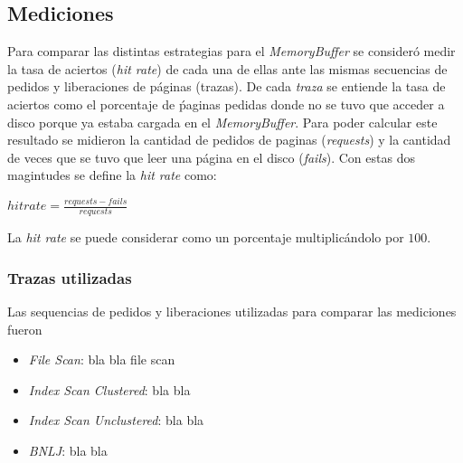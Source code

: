 \subsection{Mediciones}
Para comparar las distintas estrategias para el \textit{MemoryBuffer} se consider\'o medir
la tasa de aciertos (\textit{hit rate}) de cada una de ellas ante las mismas secuencias 
de pedidos y liberaciones de p\'aginas (trazas). De cada \textit{traza} se entiende la tasa
de aciertos como el porcentaje de \'paginas pedidas donde no se tuvo que acceder a disco
porque ya estaba cargada en el \textit{MemoryBuffer}. Para poder calcular este resultado
se midieron la cantidad de pedidos de paginas (\textit{requests}) y la cantidad de veces
que se tuvo que leer una p\'agina en el disco (\textit{fails}). Con estas dos magintudes
se define la \textit{hit rate} como: \\
\begin{center}
$hit rate = \frac{requests-fails}{requests}$  
\end{center}
La \textit{hit rate} se puede considerar como un porcentaje multiplic\'andolo por $100$.

\subsubsection{Trazas utilizadas}
Las sequencias de pedidos y liberaciones utilizadas para comparar las mediciones fueron
\begin{itemize}
\item \textit{File Scan}: bla bla file scan
\item \textit{Index Scan Clustered}: bla bla
\item \textit{Index Scan Unclustered}: bla bla
\item \textit{BNLJ}: bla bla
\end{itemize}
   
